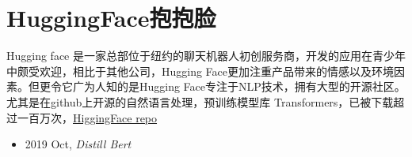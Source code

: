 \section{HuggingFace抱抱脸}\label{com:HuggingFace}
Hugging face 是一家总部位于纽约的聊天机器人初创服务商，开发的应用在青少年中颇受欢迎，相比于其他公司，Hugging Face更加注重产品带来的情感以及环境因素。但更令它广为人知的是Hugging Face专注于NLP技术，拥有大型的开源社区。尤其是在github上开源的自然语言处理，预训练模型库 Transformers，已被下载超过一百万次，\href{https://github.com/huggingface/transformers}{HiggingFace repo}

\begin{itemize}
    \item 2019 Oct, \textit{Distill Bert} \cite{DistilBert}
\end{itemize}
